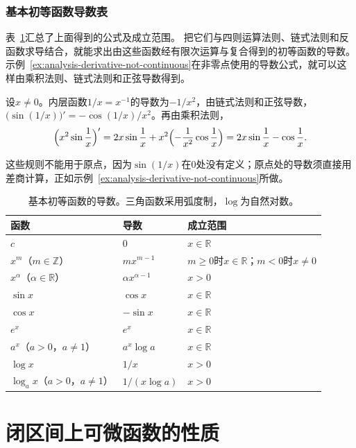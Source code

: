 \subsubsection{基本初等函数导数表}
表~\ref{tab:analysis-elementary-derivatives}汇总了上面得到的公式及成立范围。
把它们与四则运算法则、链式法则和反函数求导结合，就能求出由这些函数经有限次运算与复合得到的初等函数的导数。
示例~\ref{ex:analysis-derivative-not-continuous}在非零点使用的导数公式，就可以这样由乘积法则、链式法则和正弦导数得到。
\begin{example}
\label{ex:analysis-oscillating-derivative-formula}
设$x\neq0$。内层函数$1/x=x^{-1}$的导数为$-1/x^2$，由链式法则和正弦导数，$\bigl(\sin(1/x)\bigr)'=-\cos(1/x)/x^2$。再由乘积法则，
\[
 \Bigl(x^2\sin\frac1x\Bigr)'
 =2x\sin\frac1x+x^2\Bigl(-\frac1{x^2}\cos\frac1x\Bigr)
 =2x\sin\frac1x-\cos\frac1x.
\]
\end{example}
这些规则不能用于原点，因为$\sin(1/x)$在$0$处没有定义；原点处的导数须直接用差商计算，正如示例~\ref{ex:analysis-derivative-not-continuous}所做。
\begin{table}[htbp]
 \centering\small
 \begin{tabular}{@{}lll@{}}
 \toprule
 函数 & 导数 & 成立范围\\
 \midrule
 $c$ & $0$ & $x\in\mathbb R$\\
 $x^m$（$m\in\mathbb Z$） & $mx^{m-1}$ & $m\geq0$时$x\in\mathbb R$；$m<0$时$x\neq0$\\
 $x^\alpha$（$\alpha\in\mathbb R$） & $\alpha x^{\alpha-1}$ & $x>0$\\
 $\sin x$ & $\cos x$ & $x\in\mathbb R$\\
 $\cos x$ & $-\sin x$ & $x\in\mathbb R$\\
 $e^x$ & $e^x$ & $x\in\mathbb R$\\
 $a^x$（$a>0$，$a\neq1$） & $a^x\log a$ & $x\in\mathbb R$\\
 $\log x$ & $1/x$ & $x>0$\\
 $\log_a x$（$a>0$，$a\neq1$） & $1/(x\log a)$ & $x>0$\\
 \bottomrule
 \end{tabular}
 \caption{基本初等函数的导数。三角函数采用弧度制，$\log$为自然对数。}
 \label{tab:analysis-elementary-derivatives}
\end{table}

\section{闭区间上可微函数的性质}


